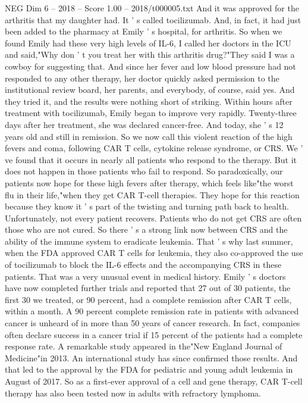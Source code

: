\begin{textsample}{NEG Dim 6 – 2018 – Score 1.00 – 2018/t000005.txt}
And it was approved for the arthritis that my daughter had.
It ' s called tocilizumab.
And, in fact, it had just been added to the pharmacy at Emily ' s hospital, for arthritis.
So when we found Emily had these very high levels of IL-6, I called her doctors in the ICU and said,"Why don ' t you treat her with this arthritis drug?"They said I was a cowboy for suggesting that.
And since her fever and low blood pressure had not responded to any other therapy, her doctor quickly asked permission to the institutional review board, her parents, and everybody, of course, said yes.
And they tried it, and the results were nothing short of striking.
Within hours after treatment with tocilizumab, Emily began to improve very rapidly.
Twenty-three days after her treatment, she was declared cancer-free.
And today, she ' s 12 years old and still in remission.
So we now call this violent reaction of the high fevers and coma, following CAR T cells, cytokine release syndrome, or CRS.
We ' ve found that it occurs in nearly all patients who respond to the therapy.
But it does not happen in those patients who fail to respond.
So paradoxically, our patients now hope for these high fevers after therapy, which feels like"the worst flu in their life,"when they get CAR T-cell therapies.
They hope for this reaction because they know it ' s part of the twisting and turning path back to health.
Unfortunately, not every patient recovers.
Patients who do not get CRS are often those who are not cured.
So there ' s a strong link now between CRS and the ability of the immune system to eradicate leukemia.
That ' s why last summer, when the FDA approved CAR T cells for leukemia, they also co-approved the use of tocilizumab to block the IL-6 effects and the accompanying CRS in these patients.
That was a very unusual event in medical history.
Emily ' s doctors have now completed further trials and reported that 27 out of 30 patients, the first 30 we treated, or 90 percent, had a complete remission after CAR T cells, within a month.
A 90 percent complete remission rate in patients with advanced cancer is unheard of in more than 50 years of cancer research.
In fact, companies often declare success in a cancer trial if 15 percent of the patients had a complete response rate.
A remarkable study appeared in the"New England Journal of Medicine"in 2013.
An international study has since confirmed those results.
And that led to the approval by the FDA for pediatric and young adult leukemia in August of 2017.
So as a first-ever approval of a cell and gene therapy, CAR T-cell therapy has also been tested now in adults with refractory lymphoma.

\end{textsample}
